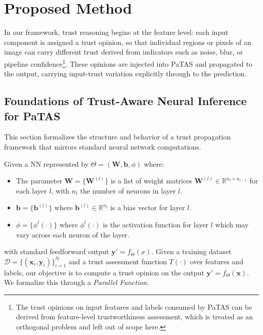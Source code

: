 \vspace{-0.5em}
\section{Proposed Method}\label{sec:method}
In our framework, trust reasoning begins at the feature level: each input component is assigned a trust opinion, so that individual regions or pixels of an image can carry different trust derived from indicators such as noise, blur, or pipeline confidence\footnote{The trust opinions on input features and labels consumed by 
PaTAS can be derived from feature-level trustworthiness 
assessment, which is treated as an orthogonal problem and left 
out of scope here.}. These opinions are injected into PaTAS and propagated to the output, carrying input-trust variation explicitly through to the prediction.

\vspace{-0.5em}
\subsection{Foundations of Trust-Aware Neural Inference for PaTAS}
This section formalizes the structure and behavior of a trust propagation framework that mirrors standard neural network computations.

Given a NN represented by \(\Theta = \left(\mathbf{W}, \mathbf{b}, \phi\right)\) where:
\begin{itemize}
    \item The parameter \(\mathbf{W} = \{\mathbf{W}^{(l)}\} \) is a list of weight matrices $\mathbf{W}^{(l)} \in \mathbb{R}^{n_l \times n_{l-1}}$ for each layer $l$, with $n_l$ the number of neurons in layer $l$.
    \item $\mathbf{b} = \{\mathbf{b}^{(l)}\}$ where \(\mathbf{b}^{(l)} \in \mathbb{R}^{n_l}\)  is a bias vector for layer $l$.
    \item $\phi = \{\phi^l(\cdot)\} $ where \(\phi^l(\cdot)\) is the activation function for layer \(l\) which may vary across each neuron of the layer.
\end{itemize}
with standard feedforward output \(\mathbf{y\prime} = f_\Theta(x)\). Given a training dataset \( \mathcal{D} = \{ (\mathbf{x}_i, \mathbf{y}_i) \}_{i=1}^{N} \) and a trust assessment function \( T(\cdot) \) over features and labels, our objective is to compute a trust opinion on the output \( \mathbf{y\prime} = f_\Theta(\mathbf{x}) \). We formalize this through a \emph{Parallel Function}.

